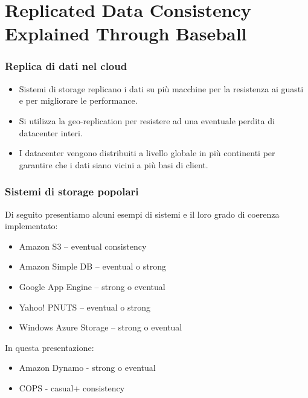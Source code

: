 \section{Replicated Data Consistency Explained Through Baseball}

\begin{frame}
 \frametitle{Replica di dati nel cloud}
 \begin{itemize}
   \item Sistemi di storage replicano i dati su più macchine per la resistenza ai guasti e per migliorare le performance.
   \item Si utilizza la geo-replication per resistere ad una eventuale perdita di datacenter interi.
   \item I datacenter vengono distribuiti a livello globale in più continenti per garantire che i dati siano vicini a più basi di client.
 \end{itemize}
  
\end{frame}

\begin{frame}
 \frametitle{Sistemi di storage popolari}
Di seguito presentiamo alcuni esempi di sistemi e il loro grado di coerenza implementato:
 \begin{itemize}
   \item Amazon S3 – eventual consistency
   \item Amazon Simple DB – eventual o strong
   \item Google App Engine – strong o eventual
   \item Yahoo! PNUTS – eventual o strong
   \item Windows Azure Storage – strong o eventual
 \end{itemize}
In questa presentazione:
\begin{itemize}
  \item Amazon Dynamo - strong o eventual
  \item COPS - casual+ consistency
\end{itemize}
\end{frame}

